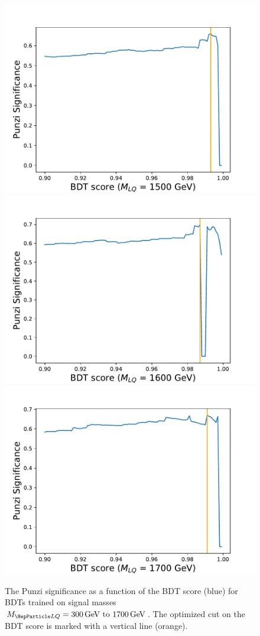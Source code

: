 \begin{figure}[H]
    {\includegraphics[width=.32\textwidth]{Images/Analysis/Results_combined_Unblinded/Plots/Optimization/Opt_BDT_M1500.pdf}}
    {\includegraphics[width=.32\textwidth]{Images/Analysis/Results_combined_Unblinded/Plots/Optimization/Opt_BDT_M1600.pdf}}
    {\includegraphics[width=.32\textwidth]{Images/Analysis/Results_combined_Unblinded/Plots/Optimization/Opt_BDT_M1700.pdf}}
    \caption{The Punzi significance as a function of the BDT score (blue) for BDTs trained on signal masses $\MLQ = \SIrange{300}{1700}{GeV}$. The optimized cut on the BDT score is marked with a vertical line (orange).
    \label{figapp:punzivsbdt1}}
\end{figure}


